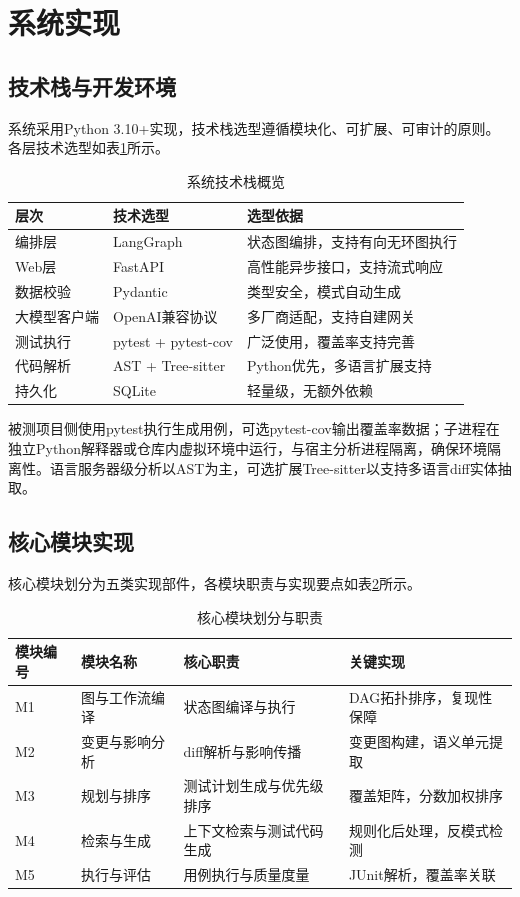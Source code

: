 \section{系统实现}\label{sec:system_implementation}
\subsection{技术栈与开发环境}\label{sec:tech_stack}

系统采用Python 3.10+实现，技术栈选型遵循模块化、可扩展、可审计的原则。各层技术选型如表\ref{tab:tech_stack}所示。

\begin{table}[htbp]
\centering
\caption{系统技术栈概览}\label{tab:tech_stack}
\begin{tabular}{lll}
\toprule
\textbf{层次} & \textbf{技术选型} & \textbf{选型依据} \\
\midrule
编排层 & LangGraph & 状态图编排，支持有向无环图执行 \\
Web层 & FastAPI & 高性能异步接口，支持流式响应 \\
数据校验 & Pydantic & 类型安全，模式自动生成 \\
大模型客户端 & OpenAI兼容协议 & 多厂商适配，支持自建网关 \\
测试执行 & pytest + pytest-cov & 广泛使用，覆盖率支持完善 \\
代码解析 & AST + Tree-sitter & Python优先，多语言扩展支持 \\
持久化 & SQLite & 轻量级，无额外依赖 \\
\bottomrule
\end{tabular}
\end{table}

被测项目侧使用pytest执行生成用例，可选pytest-cov输出覆盖率数据；子进程在独立Python解释器或仓库内虚拟环境中运行，与宿主分析进程隔离，确保环境隔离性。语言服务器级分析以AST为主，可选扩展Tree-sitter以支持多语言diff实体抽取。

\subsection{核心模块实现}\label{sec:core_modules}

核心模块划分为五类实现部件，各模块职责与实现要点如表\ref{tab:core_modules}所示。

\begin{table}[htbp]
\centering
\caption{核心模块划分与职责}\label{tab:core_modules}
\begin{tabular}{llll}
\toprule
\textbf{模块编号} & \textbf{模块名称} & \textbf{核心职责} & \textbf{关键实现} \\
\midrule
M1 & 图与工作流编译 & 状态图编译与执行 & DAG拓扑排序，复现性保障 \\
M2 & 变更与影响分析 & diff解析与影响传播 & 变更图构建，语义单元提取 \\
M3 & 规划与排序 & 测试计划生成与优先级排序 & 覆盖矩阵，分数加权排序 \\
M4 & 检索与生成 & 上下文检索与测试代码生成 & 规则化后处理，反模式检测 \\
M5 & 执行与评估 & 用例执行与质量度量 & JUnit解析，覆盖率关联 \\
\bottomrule
\end{tabular}
\end{table}

